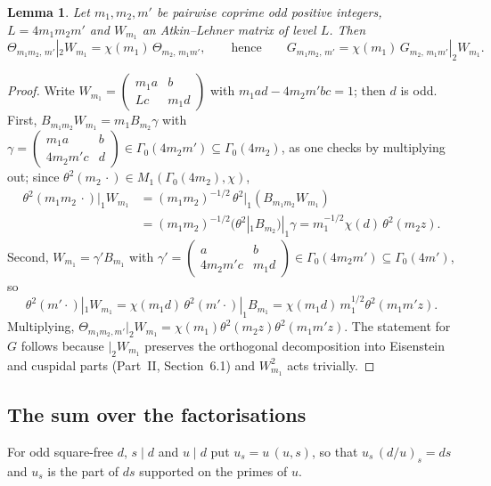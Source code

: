 \documentclass[11pt]{amsart}
\newtheorem{lemma}[theorem]{Lemma}
\theoremstyle{remark}
\begin{document}
\begin{lemma}\label{lem:transport}
Let $m_1,m_2,m'$ be pairwise coprime odd positive integers, $L=4m_1m_2m'$ and $W_{m_1}$ an Atkin--Lehner matrix of level $L$. Then
\[
\Theta_{m_1m_2,\,m'}|_2W_{m_1}=\chi(m_1)\,\Theta_{m_2,\,m_1m'},\qquad\text{hence}\qquad G_{m_1m_2,\,m'}=\chi(m_1)\,G_{m_2,\,m_1m'}|_2W_{m_1}.
\]
\end{lemma}
\begin{proof}
Write $W_{m_1}=\left(\begin{smallmatrix}m_1a&b\\Lc&m_1d\end{smallmatrix}\right)$ with $m_1ad-4m_2m'bc=1$; then $d$ is odd. First, $B_{m_1m_2}W_{m_1}=m_1B_{m_2}\gamma$ with $\gamma=\left(\begin{smallmatrix}m_1a&b\\4m_2m'c&d\end{smallmatrix}\right)\in\Gamma_0(4m_2m')\subseteq\Gamma_0(4m_2)$, as one checks by multiplying out; since $\theta^2(m_2\,\cdot)\in M_1(\Gamma_0(4m_2),\chi)$,
\begin{align*}
\theta^2(m_1m_2\,\cdot)|_1W_{m_1}&=(m_1m_2)^{-1/2}\,\theta^2|_1(B_{m_1m_2}W_{m_1})\\
&=(m_1m_2)^{-1/2}\bigl(\theta^2|_1B_{m_2}\bigr)|_1\gamma=m_1^{-1/2}\chi(d)\,\theta^2(m_2z).
\end{align*}
Second, $W_{m_1}=\gamma'B_{m_1}$ with $\gamma'=\left(\begin{smallmatrix}a&b\\4m_2m'c&m_1d\end{smallmatrix}\right)\in\Gamma_0(4m_2m')\subseteq\Gamma_0(4m')$, so
\[
\theta^2(m'\cdot)|_1W_{m_1}=\chi(m_1d)\,\theta^2(m'\cdot)|_1B_{m_1}=\chi(m_1d)\,m_1^{1/2}\theta^2(m_1m'z).
\]
Multiplying, $\Theta_{m_1m_2,m'}|_2W_{m_1}=\chi(m_1)\theta^2(m_2z)\theta^2(m_1m'z)$. The statement for $G$ follows because $|_2W_{m_1}$ preserves the orthogonal decomposition into Eisenstein and cuspidal parts (Part~II, Section~6.1) and $W_{m_1}^2$ acts trivially.
\end{proof}

\subsection{The sum over the factorisations}
For odd square-free $d$, $s\mid d$ and $u\mid d$ put $u_s=u\,(u,s)$, so that $u_s\,(d/u)_s=ds$ and $u_s$ is the part of $ds$ supported on the primes of $u$.
\end{document}

